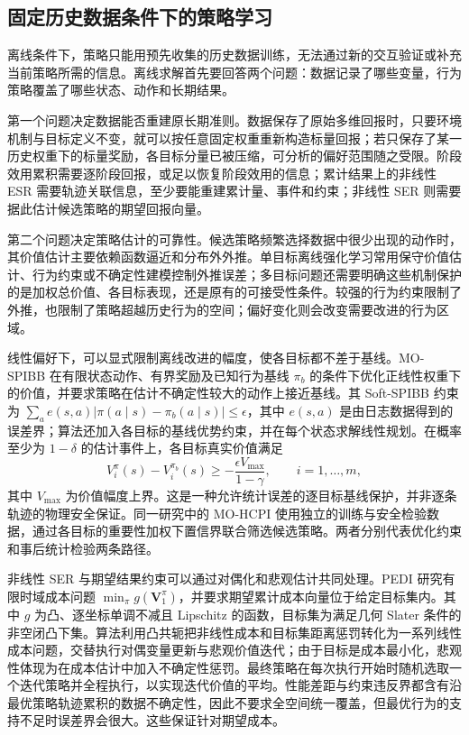 \subsection{固定历史数据条件下的策略学习}\label{sec:solving-offline}

离线条件下，策略只能用预先收集的历史数据训练，无法通过新的交互验证或补充当前策略所需的信息。离线求解首先要回答两个问题：数据记录了哪些变量，行为策略覆盖了哪些状态、动作和长期结果。

第一个问题决定数据能否重建原长期准则。数据保存了原始多维回报时，只要环境机制与目标定义不变，就可以按任意固定权重重新构造标量回报；若只保存了某一历史权重下的标量奖励，各目标分量已被压缩，可分析的偏好范围随之受限。阶段效用累积需要逐阶段回报，或足以恢复阶段效用的信息；累计结果上的非线性 ESR 需要轨迹关联信息，至少要能重建累计量、事件和约束；非线性 SER 则需要据此估计候选策略的期望回报向量。

第二个问题决定策略估计的可靠性。候选策略频繁选择数据中很少出现的动作时，其价值估计主要依赖函数逼近和分布外外推。单目标离线强化学习常用保守价值估计、行为约束或不确定性建模控制外推误差\cite{kumar2020}；多目标问题还需要明确这些机制保护的是加权总价值、各目标表现，还是原有的可接受性条件。较强的行为约束限制了外推，也限制了策略超越历史行为的空间；偏好变化则会改变需要改进的行为区域。

线性偏好下，可以显式限制离线改进的幅度，使各目标都不差于基线。MO-SPIBB 在有限状态动作、有界奖励及已知行为基线 $\pi_b$ 的条件下优化正线性权重下的价值，并要求策略在估计不确定性较大的动作上接近基线\cite{satija2021mospibb}。其 Soft-SPIBB 约束为 $\sum_a e(s,a)|\pi(a\mid s)-\pi_b(a\mid s)|\leq\epsilon$，其中 $e(s,a)$ 是由日志数据得到的误差界；算法还加入各目标的基线优势约束，并在每个状态求解线性规划。在概率至少为 $1-\delta$ 的估计事件上，各目标真实价值满足
\begin{equation}
V_i^\pi(s)-V_i^{\pi_b}(s)
\geq-\frac{\epsilon V_{\max}}{1-\gamma},\qquad i=1,\ldots,m,
\end{equation}
其中 $V_{\max}$ 为价值幅度上界。这是一种允许统计误差的逐目标基线保护，并非逐条轨迹的物理安全保证。同一研究中的 MO-HCPI 使用独立的训练与安全检验数据，通过各目标的重要性加权下置信界联合筛选候选策略。两者分别代表优化约束和事后统计检验两条路径。

非线性 SER 与期望结果约束可以通过对偶化和悲观估计共同处理。PEDI 研究有限时域成本问题 $\min_\pi g(\mathbf V^\pi_1)$，并要求期望累计成本向量位于给定目标集内\cite{wu2021pedi}。其中 $g$ 为凸、逐坐标单调不减且 Lipschitz 的函数，目标集为满足几何 Slater 条件的非空闭凸下集。算法利用凸共轭把非线性成本和目标集距离惩罚转化为一系列线性成本问题，交替执行对偶变量更新与悲观价值迭代；由于目标是成本最小化，悲观性体现为在成本估计中加入不确定性惩罚。最终策略在每次执行开始时随机选取一个迭代策略并全程执行，以实现迭代价值的平均。性能差距与约束违反界都含有沿最优策略轨迹累积的数据不确定性，因此不要求全空间统一覆盖，但最优行为的支持不足时误差界会很大。这些保证针对期望成本。

